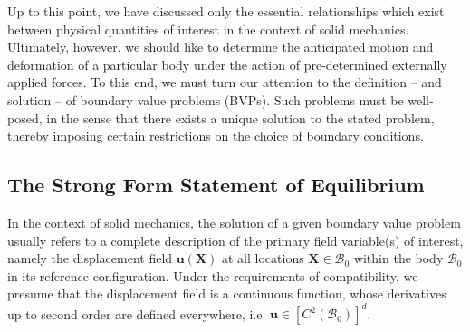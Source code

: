 Up to this point, we have discussed only the essential relationships which exist between physical quantities of interest in the context of solid mechanics. Ultimately, however, we should like to determine the anticipated motion and deformation of a particular body under the action of pre-determined externally applied forces. To this end, we must turn our attention to the definition -- and solution -- of boundary value problems (BVPs). Such problems must be well-posed, in the sense that there exists a unique solution to the stated problem, thereby imposing certain restrictions on the choice of boundary conditions.

\subsection*{The Strong Form Statement of Equilibrium} \label{sec:strongform}

In the context of solid mechanics, the solution of a given boundary value problem usually refers to a complete description of the primary field variable(s) of interest, namely the displacement field $\mathbf{u} (\mathbf{X})$ at all locations $\mathbf{X} \in \mathcal{B}_0$ within the body $\mathcal{B}_0$ in its reference configuration. Under the requirements of compatibility, we presume that the displacement field is a continuous function, whose derivatives up to second order are defined everywhere, i.e. $\mathbf{u} \in \left[ C^2 (\mathcal{B}_0) \right]^d$.

